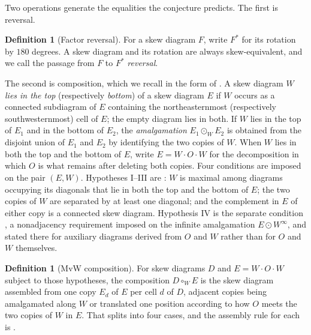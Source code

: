 \documentclass[11pt,a4paper]{amsart}
\numberwithin{equation}{section}
\theoremstyle{plain}
\theoremstyle{definition}
\newtheorem{definition}[theorem]{Definition}
\begin{document}
Two operations generate the equalities the conjecture predicts.  The first is reversal.

\begin{definition}[Factor reversal]\label{def:reversal}
For a skew diagram \(F\), write \(F^{*}\) for its rotation by \(180\) degrees.  A skew diagram and its rotation are always skew-equivalent, and we call the passage from \(F\) to \(F^{*}\) \emph{reversal}.
\end{definition}

The second is composition, which we recall in the form of \cite[Defs.~3.5, 3.11]{McNamara2009Classification}.  A skew diagram \(W\) \emph{lies in the top} (respectively \emph{bottom}) of a skew diagram \(E\) if \(W\) occurs as a connected subdiagram of \(E\) containing the northeasternmost (respectively southwesternmost) cell of \(E\); the empty diagram lies in both.  If \(W\) lies in the top of \(E_1\) and in the bottom of \(E_2\), the \emph{amalgamation} \(E_1\odot_W E_2\) is obtained from the disjoint union of \(E_1\) and \(E_2\) by identifying the two copies of \(W\).  When \(W\) lies in both the top and the bottom of \(E\), write \(E=W\!\cdot\!O\!\cdot\!W\) for the decomposition in which \(O\) is what remains after deleting both copies.  Four conditions are imposed on the pair \((E,W)\).  Hypotheses I--III are \cite[Hyp.~3.8]{McNamara2009Classification}: \(W\) is maximal among diagrams occupying its diagonals that lie in both the top and the bottom of \(E\); the two copies of \(W\) are separated by at least one diagonal; and the complement in \(E\) of either copy is a connected skew diagram.  Hypothesis IV is the separate condition \cite[Hyp.~3.22]{McNamara2009Classification}, a nonadjacency requirement imposed on the infinite amalgamation \(E\!\odot\!W^{\infty}\), and stated there for auxiliary diagrams derived from \(O\) and \(W\) rather than for \(O\) and \(W\) themselves.

\begin{definition}[MvW composition]\label{def:composition}
For skew diagrams \(D\) and \(E=W\!\cdot\!O\!\cdot\!W\) subject to those hypotheses, the composition \(D\circ_W E\) is the skew diagram assembled from one copy \(E_d\) of \(E\) per cell \(d\) of \(D\), adjacent copies being amalgamated along \(W\) or translated one position according to how \(O\) meets the two copies of \(W\) in \(E\).  That splits into four cases, and the assembly rule for each is \cite[Def.~3.11]{McNamara2009Classification}.
\end{definition}
\end{document}
